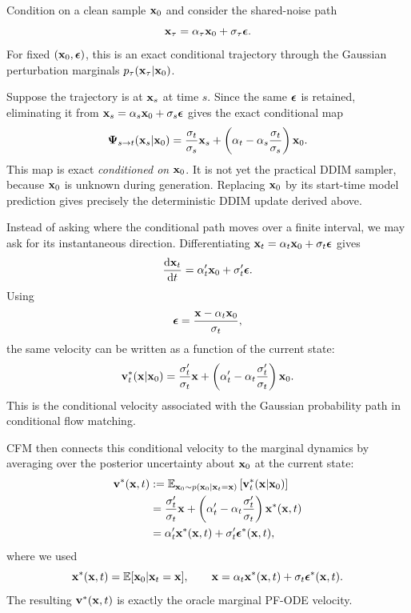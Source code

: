 Condition on a clean sample ${\mathbf{x}}_0$ and consider the shared-noise path
\[
{\mathbf{x}}_\tau
=
\alpha_\tau{\mathbf{x}}_0
+
\sigma_\tau{\bm{\epsilon}}.
\]
For fixed $({\mathbf{x}}_0,{\bm{\epsilon}})$, this is an exact conditional trajectory through
the Gaussian perturbation marginals
$p_\tau({\mathbf{x}}_\tau|{\mathbf{x}}_0)$.

Suppose the trajectory is at ${\mathbf{x}}_s$ at time $s$. Since the same
${\bm{\epsilon}}$ is retained, eliminating it from
${\mathbf{x}}_s=\alpha_s{\mathbf{x}}_0+\sigma_s{\bm{\epsilon}}$ gives the exact conditional map
\[
{\bm{\Psi}}_{s\to t}({\mathbf{x}}_s|{\mathbf{x}}_0)
=
\frac{\sigma_t}{\sigma_s}{\mathbf{x}}_s
+
\left(
\alpha_t
-
\alpha_s\frac{\sigma_t}{\sigma_s}
\right){\mathbf{x}}_0.
\]
This map is exact \emph{conditioned on ${\mathbf{x}}_0$}. It is not yet the practical
DDIM sampler, because ${\mathbf{x}}_0$ is unknown during generation. Replacing
${\mathbf{x}}_0$ by its start-time model prediction gives precisely the deterministic
DDIM update derived above.

Instead of asking where the conditional path moves over a finite interval,
we may ask for its instantaneous direction. Differentiating
${\mathbf{x}}_t=\alpha_t{\mathbf{x}}_0+\sigma_t{\bm{\epsilon}}$ gives
\[
\frac{\mathop{}\!\mathrm{d}{\mathbf{x}}_t}{\mathop{}\!\mathrm{d} t}
=
\alpha_t'{\mathbf{x}}_0+\sigma_t'{\bm{\epsilon}}.
\]
Using
\[
{\bm{\epsilon}}
=
\frac{{\mathbf{x}}-\alpha_t{\mathbf{x}}_0}{\sigma_t},
\]
the same velocity can be written as a function of the current state:
\[
{\mathbf{v}}_t^*({\mathbf{x}}|{\mathbf{x}}_0)
=
\frac{\sigma_t'}{\sigma_t}{\mathbf{x}}
+
\left(
\alpha_t'
-
\alpha_t\frac{\sigma_t'}{\sigma_t}
\right){\mathbf{x}}_0.
\]
This is the conditional velocity associated with the Gaussian probability
path in conditional flow matching.

CFM then connects this conditional velocity to the marginal dynamics by
averaging over the posterior uncertainty about ${\mathbf{x}}_0$ at the current
state:
\begin{align*}
{\mathbf{v}}^*({\mathbf{x}},t)
&:=
\mathbb{E}_{{\mathbf{x}}_0\sim p({\mathbf{x}}_0|{\mathbf{x}}_t={\mathbf{x}})}
\left[
{\mathbf{v}}_t^*({\mathbf{x}}|{\mathbf{x}}_0)
\right]
\\
&=
\frac{\sigma_t'}{\sigma_t}{\mathbf{x}}
+
\left(
\alpha_t'
-
\alpha_t\frac{\sigma_t'}{\sigma_t}
\right)
{\mathbf{x}}^*({\mathbf{x}},t)
\\
&=
\alpha_t'{\mathbf{x}}^*({\mathbf{x}},t)
+
\sigma_t'{\bm{\epsilon}}^*({\mathbf{x}},t),
\end{align*}
where we used
\[
{\mathbf{x}}^*({\mathbf{x}},t)
=
\mathbb{E}[{\mathbf{x}}_0|{\mathbf{x}}_t={\mathbf{x}}],
\qquad
{\mathbf{x}}
=
\alpha_t{\mathbf{x}}^*({\mathbf{x}},t)
+
\sigma_t{\bm{\epsilon}}^*({\mathbf{x}},t).
\]
The resulting ${\mathbf{v}}^*({\mathbf{x}},t)$ is exactly the oracle marginal PF-ODE
velocity.


